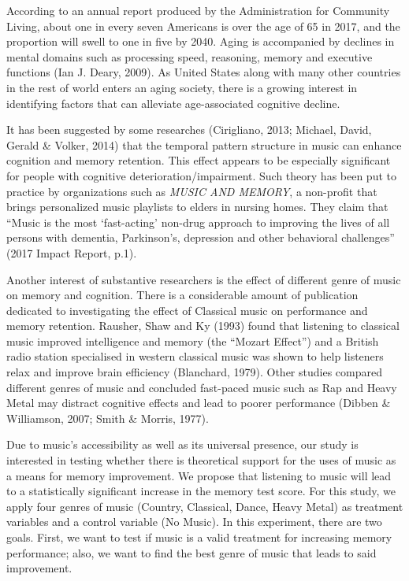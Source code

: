 \documentclass[]{article}
\begin{document}
According to an annual report produced by the Administration for
Community Living, about one in every seven Americans is over the age of
65 in 2017, and the proportion will swell to one in five by 2040. Aging
is accompanied by declines in mental domains such as processing speed,
reasoning, memory and executive functions (Ian J. Deary, 2009). As
United States along with many other countries in the rest of world
enters an aging society, there is a growing interest in identifying
factors that can alleviate age-associated cognitive decline.

It has been suggested by some researches (Cirigliano, 2013; Michael,
David, Gerald \& Volker, 2014) that the temporal pattern structure in
music can enhance cognition and memory retention. This effect appears to
be especially significant for people with cognitive
deterioration/impairment. Such theory has been put to practice by
organizations such as \emph{MUSIC AND MEMORY}, a non-profit that brings
personalized music playlists to elders in nursing homes. They claim that
``Music is the most `fast-acting' non-drug approach to improving the
lives of all persons with dementia, Parkinson's, depression and other
behavioral challenges'' (2017 Impact Report, p.1).

Another interest of substantive researchers is the effect of different
genre of music on memory and cognition. There is a considerable amount
of publication dedicated to investigating the effect of Classical music
on performance and memory retention. Rausher, Shaw and Ky (1993) found
that listening to classical music improved intelligence and memory (the
``Mozart Effect'') and a British radio station specialised in western
classical music was shown to help listeners relax and improve brain
efficiency (Blanchard, 1979). Other studies compared different genres of
music and concluded fast-paced music such as Rap and Heavy Metal may
distract cognitive effects and lead to poorer performance (Dibben \&
Williamson, 2007; Smith \& Morris, 1977).

Due to music's accessibility as well as its universal presence, our
study is interested in testing whether there is theoretical support for
the uses of music as a means for memory improvement. We propose that
listening to music will lead to a statistically significant increase in
the memory test score. For this study, we apply four genres of music
(Country, Classical, Dance, Heavy Metal) as treatment variables and a
control variable (No Music). In this experiment, there are two goals.
First, we want to test if music is a valid treatment for increasing
memory performance; also, we want to find the best genre of music that
leads to said improvement.
\end{document}
